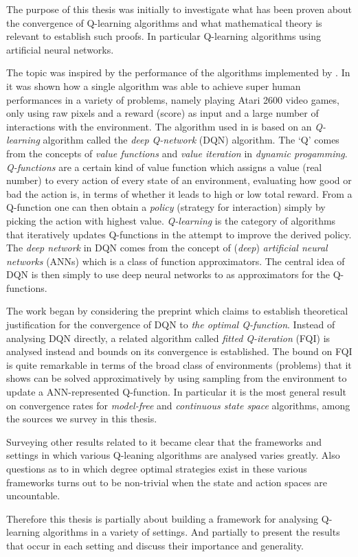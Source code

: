 The purpose of this thesis was initially 
to investigate what has been proven
about the convergence of Q-learning algorithms
and what mathematical theory is relevant to establish such proofs.
In particular Q-learning algorithms using artificial neural networks.

The topic was inspired by the performance of the algorithms
implemented by .
In  it was shown how a single algorithm was able to achieve super
human performances in a variety of problems, namely playing Atari 2600 video
games, only using raw pixels and a reward (score) as input and a large number of
interactions with the environment.
The algorithm used in  is based on an \emph{Q-learning}
algorithm called the \emph{deep Q-network} (DQN) algorithm.
The `Q' comes from the concepts of \emph{value functions} and
\emph{value iteration} in \emph{dynamic progamming}.
\emph{Q-functions} are a certain kind of value function which assigns a value
(real number) to every action of every state of an environment,
evaluating how good or bad the action is, in terms of whether it leads to
high or low total reward.
From a Q-function one can then obtain a \emph{policy} (strategy for interaction)
simply by picking the action with highest value.
\emph{Q-learning} is the category of algorithms that iteratively updates
Q-functions in the attempt to improve the derived policy.
The \emph{deep network} in DQN comes from the concept of (\emph{deep})
\emph{artificial neural networks} (ANNs)
which is a class of function approximators.
The central idea of DQN is then simply to use deep neural networks
to as approximators for the Q-functions.

The work began by considering the preprint
 which claims to establish theoretical justification for
the convergence of DQN to \emph{the optimal Q-function}.
Instead of analysing DQN directly,
a related algorithm called \emph{fitted Q-iteration} (FQI) is
analysed instead and bounds on its convergence is established.
The bound on FQI is quite remarkable in terms of the broad class
of environments (problems) that it shows can be solved approximatively by using
sampling from the environment to update a ANN-represented Q-function.
In particular it is the most general result on convergence rates for
\emph{model-free} and \emph{continuous state space} algorithms,
among the sources we survey in this thesis.

Surveying other results related to 
it became clear that the frameworks
and settings in which various Q-leaning algorithms are analysed
varies greatly.
Also questions as to in which degree optimal strategies
exist in these various frameworks turns out to be
non-trivial when the state and action spaces are uncountable.

Therefore this thesis is partially about building a framework
for analysing Q-learning algorithms in a variety of settings.
And partially to present the results that occur in each setting
and discuss their importance and generality.



